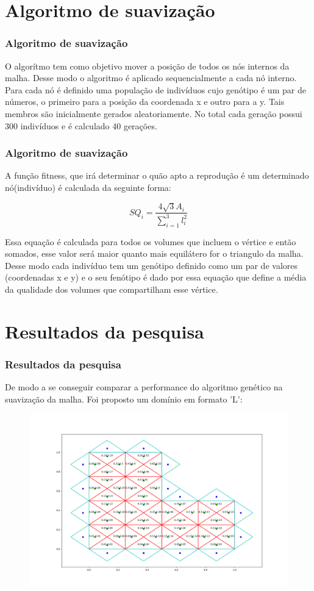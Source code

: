 \documentclass[brazil]{beamer}
\begin{document}
\section{Algoritmo de suavização}
\begin{frame}
  \frametitle{Algoritmo de suavização}

  O algorítmo tem como objetivo mover a posição de todos os nós internos da malha. Desse modo o algoritmo é aplicado sequencialmente a cada nó interno. Para cada nó é definido uma população de indivíduos cujo genótipo é um par de números, o primeiro para a posição da coordenada x e outro para a y. Tais membros são inicialmente gerados aleatoriamente. No total cada geração possui 300 indivíduos e é calculado 40 gerações.

\end{frame}

\begin{frame}
  \frametitle{Algoritmo de suavização}

  A função fitness, que irá determinar o quão apto a reprodução é um determinado nó(indivíduo) é calculada da seguinte forma:

  \begin{equation}
    SQ_i = \frac{4\sqrt{3}A_i}{\sum_{i=1}^3 l_i^2}
  \end{equation}

  Essa equação é calculada para todos os volumes que incluem o vértice e então somados, esse valor será maior quanto mais equilátero for o triangulo da malha. Desse modo cada indivíduo tem um genótipo definido como um par de valores (coordenadas x e y) e o seu fenótipo é dado por essa equação que define a média da qualidade dos volumes que compartilham esse vértice.
\end{frame}

\section{Resultados da pesquisa}
\begin{frame}
  \frametitle{Resultados da pesquisa}
  De modo a se conseguir comparar a performance do algoritmo genético na suavização da malha. Foi proposto um domínio em formato 'L':

  \begin{figure}
    \includegraphics[width=0.6\linewidth]{malha_inicial.png}
  \end{figure}
\end{frame}
\end{document}
